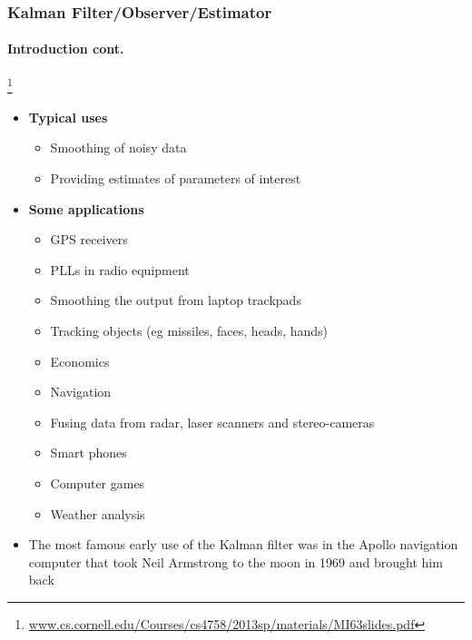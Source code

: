 \documentclass{beamer}
\begin{document}
\begin{frame}
\frametitle{Kalman Filter/Observer/Estimator}
\framesubtitle{Introduction \tiny cont.}

\footnote{\tiny\hspace{-0.23in} \href{www.cs.cornell.edu/Courses/cs4758/2013sp/materials/MI63slides.pdf‎}{www.cs.cornell.edu/Courses/cs4758/2013sp/materials/MI63slides.pdf‎}}
\begin{itemize}\scriptsize
\item \textbf{Typical uses}
\begin{itemize}\scriptsize
\item Smoothing of noisy data 
\item Providing estimates of parameters of interest
\end{itemize}
\item \textbf{Some applications}
\begin{itemize}\scriptsize
\item GPS receivers
\item PLLs in radio equipment
\item Smoothing the output from laptop trackpads
\item Tracking objects (eg missiles, faces, heads, hands)
\item Economics
\item Navigation
\item Fusing data from radar, laser scanners and stereo-cameras
\item Smart phones
\item Computer games
\item Weather analysis
\end{itemize}
\item The most famous early use of the Kalman filter was in the Apollo navigation computer that took Neil Armstrong to the moon in 1969 and brought him back
\end{itemize}
\end{frame}
\end{document}
